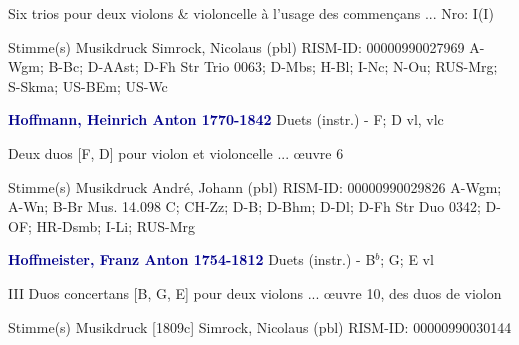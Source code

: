 \documentclass[twocolumn]{book}
\begin{document}
\newline \begin{itshape}Six trios pour deux violons \& violoncelle à l'usage des commençans ... Nro: I(I)\end{itshape} 
\newline \textcolor{darkblue}{}  Stimme(s)
\newline Musikdruck
\newline Simrock, Nicolaus  (pbl)
\newline RISM-ID: 00000990027969
\newline A-Wgm; B-Bc; D-AAst; D-Fh  Str Trio 0063; D-Mbs; H-Bl; I-Nc; N-Ou; RUS-Mrg; S-Skma; US-BEm; US-Wc
\newline \par \vspace{7pt} \textcolor{darkblue}{\textbf{Hoffmann, Heinrich Anton  1770-1842}}
\newline Duets (instr.) - F; D
\newline vl, vlc
\newline \begin{itshape}Deux duos [F, D] pour violon et violoncelle ... œuvre 6\end{itshape} 
\newline \textcolor{darkblue}{}  Stimme(s)
\newline Musikdruck
\newline André, Johann  (pbl)
\newline RISM-ID: 00000990029826
\newline A-Wgm; A-Wn; B-Br  Mus. 14.098 C; CH-Zz; D-B; D-Bhm; D-Dl; D-Fh  Str Duo 0342; D-OF; HR-Dsmb; I-Li; RUS-Mrg
\newline \par \vspace{7pt} \textcolor{darkblue}{\textbf{Hoffmeister, Franz Anton  1754-1812}}
\newline Duets (instr.) - B$^b$; G; E
 vl
\newline \begin{itshape}III Duos concertans [B, G, E] pour deux violons ... œuvre 10, des duos de violon\end{itshape} 
\newline \textcolor{darkblue}{}  Stimme(s)
\newline Musikdruck  [1809c]
\newline Simrock, Nicolaus  (pbl)
\newline RISM-ID: 00000990030144
\end{document}
